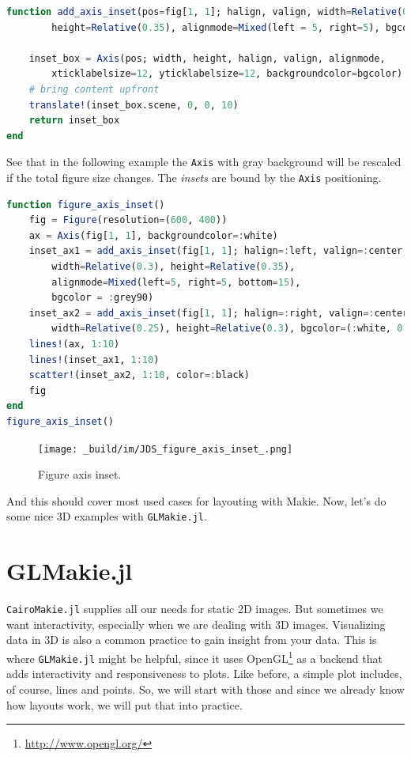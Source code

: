 \documentclass[
  notoc %
]{tufte-book}
\DeclareRobustCommand{\href}[2]{#2\footnote{\url{#1}}}
\newcommand{\passthrough}[1]{#1}
\begin{document}
\begin{lstlisting}[language=Julia]
function add_axis_inset(pos=fig[1, 1]; halign, valign, width=Relative(0.5),
        height=Relative(0.35), alignmode=Mixed(left = 5, right=5), bgcolor=:lightgray)

    inset_box = Axis(pos; width, height, halign, valign, alignmode,
        xticklabelsize=12, yticklabelsize=12, backgroundcolor=bgcolor)
    # bring content upfront
    translate!(inset_box.scene, 0, 0, 10)
    return inset_box
end
\end{lstlisting}

See that in the following example the \passthrough{\lstinline!Axis!}
with gray background will be rescaled if the total figure size changes.
The \emph{insets} are bound by the \passthrough{\lstinline!Axis!}
positioning.

\begin{lstlisting}[language=Julia]
function figure_axis_inset()
    fig = Figure(resolution=(600, 400))
    ax = Axis(fig[1, 1], backgroundcolor=:white)
    inset_ax1 = add_axis_inset(fig[1, 1]; halign=:left, valign=:center,
        width=Relative(0.3), height=Relative(0.35),
        alignmode=Mixed(left=5, right=5, bottom=15),
        bgcolor = :grey90)
    inset_ax2 = add_axis_inset(fig[1, 1]; halign=:right, valign=:center,
        width=Relative(0.25), height=Relative(0.3), bgcolor=(:white, 0.65))
    lines!(ax, 1:10)
    lines!(inset_ax1, 1:10)
    scatter!(inset_ax2, 1:10, color=:black)
    fig
end
figure_axis_inset()
\end{lstlisting}

\begin{figure}
\hypertarget{fig:figure_axis_inset}{%
\centering
\texttt{[image: \_build/im/JDS\_figure\_axis\_inset\_.png]}
\caption{Figure axis inset.}\label{fig:figure_axis_inset}
}
\end{figure}

And this should cover most used cases for layouting with Makie. Now,
let's do some nice 3D examples with
\passthrough{\lstinline!GLMakie.jl!}.

\hypertarget{sec:glmakie}{%
\section{GLMakie.jl}\label{sec:glmakie}}

\passthrough{\lstinline!CairoMakie.jl!} supplies all our needs for
static 2D images. But sometimes we want interactivity, especially when
we are dealing with 3D images. Visualizing data in 3D is also a common
practice to gain insight from your data. This is where
\passthrough{\lstinline!GLMakie.jl!} might be helpful, since it uses
\href{http://www.opengl.org/}{OpenGL} as a backend that adds
interactivity and responsiveness to plots. Like before, a simple plot
includes, of course, lines and points. So, we will start with those and
since we already know how layouts work, we will put that into practice.
\end{document}
